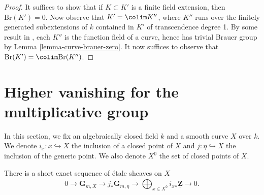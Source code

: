\begin{proof}
It suffices to show that if $K \subset K'$ is a finite field extension, then
$\text{Br}(K') = 0$. Now observe that $K' = \colim K''$, where $K''$ runs
over the finitely generated subextensions of $k$ contained in $K'$ of
transcendence degree 1. By some result in \cite{H}, each $K''$ is the function
field of a curve, hence has trivial Brauer group by
Lemma \ref{lemma-curve-brauer-zero}.
It now suffices to observe that $\text{Br}(K') = \colim \text{Br}(K'')$.
\end{proof}






\section{Higher vanishing for the multiplicative group}
\label{section-higher-Gm}

\noindent
In this section, we fix an algebraically closed field $k$ and a smooth curve
$X$ over $k$. We denote $i_x : x \hookrightarrow X$ the inclusion of a closed
point of $X$ and $j : \eta \hookrightarrow X$ the inclusion of the generic
point. We also denote $X^0$ the set of closed points of $X$.

\begin{theorem}
\label{theorem-fundamental-exact-sequence}
There is a short exact sequence of \'etale sheaves on $X$
$$
0 \longrightarrow \mathbf{G}_{m, X} \longrightarrow j_* \mathbf{G}_{m, \eta}
\xrightarrow{\ \div\ } \bigoplus_{x \in X^0} {i_x}_* \underline{\mathbf{Z}}
\longrightarrow 0.
$$
\end{theorem}

